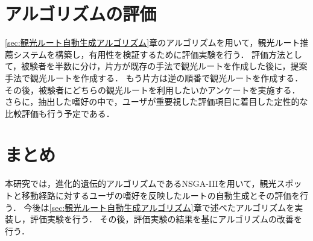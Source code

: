 
\section{アルゴリズムの評価}\label{sec:アルゴリズムの評価}
\ref{sec:観光ルート自動生成アルゴリズム}章のアルゴリズムを用いて，観光ルート推薦システムを構築し，有用性を検証するために評価実験を行う．
評価方法として，被験者を半数に分け，片方が既存の手法で観光ルートを作成した後に，提案手法で観光ルートを作成する．
もう片方は逆の順番で観光ルートを作成する．
その後，被験者にどちらの観光ルートを利用したいかアンケートを実施する．
さらに，抽出した嗜好の中で，ユーザが重要視した評価項目に着目した定性的な比較評価も行う予定である．

\section{まとめ}\label{sec:まとめ}
本研究では，進化的遺伝的アルゴリズムであるNSGA-I\hspace{-.1em}I\hspace{-.1em}Iを用いて，観光スポットと移動経路に対するユーザの嗜好を反映したルートの自動生成とその評価を行う．
今後は\ref{sec:観光ルート自動生成アルゴリズム}章で述べたアルゴリズムを実装し，評価実験を行う．
その後，評価実験の結果を基にアルゴリズムの改善を行う．


